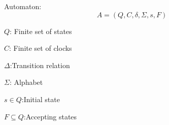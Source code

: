 \begin{definition}
    Automaton:
    $$A=(Q,C,\delta,\Sigma,s,F)$$

    $Q$: Finite set of states

    $C$: Finite set of clocks
    
    $\Delta$:Transition relation
    
    $\Sigma$: Alphabet
    
    $s\in Q$:Initial state
    
    $F\subseteq Q$:Accepting states
\end{definition}\cite*{Eugene2001}